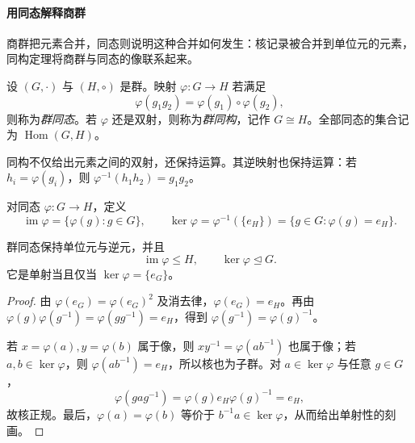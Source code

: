 \documentclass[lang=cn,a4paper,fontset=none,zihao=false,10pt,openany,twoside]{beautybook}
\numberwithin{algorithm}{chapter}
\begin{document}
\paragraph{用同态解释商群}
商群把元素合并，同态则说明这种合并如何发生：核记录被合并到单位元的元素，同构定理将商群与同态的像联系起来。
\begin{definition}[群同态与同构]
设 $(G,\cdot)$ 与 $(H,\circ)$ 是群。映射 $\varphi:G\to H$ 若满足
\[
 \varphi(g_1g_2)=\varphi(g_1)\circ\varphi(g_2),
\]
则称为\emph{群同态}。若 $\varphi$ 还是双射，则称为\emph{群同构}，记作 $G\cong H$。全部同态的集合记为 $\operatorname{Hom}(G,H)$。
\end{definition}
同构不仅给出元素之间的双射，还保持运算。其逆映射也保持运算：若 $h_i=\varphi(g_i)$，则 $\varphi^{-1}(h_1h_2)=g_1g_2$。

\begin{definition}[像与核]
对同态 $\varphi:G\to H$，定义
\[
 \operatorname{im}\varphi=\{\varphi(g):g\in G\},\qquad
 \ker\varphi=\varphi^{-1}(\{e_H\})=\{g\in G:\varphi(g)=e_H\}.
\]
\end{definition}
\begin{proposition}\label{prop:hom-kernel}
群同态保持单位元与逆元，并且
\[
 \operatorname{im}\varphi\le H,\qquad\ker\varphi\trianglelefteq G.
\]
它是单射当且仅当 $\ker\varphi=\{e_G\}$。
\end{proposition}
\begin{proof}
由 $\varphi(e_G)=\varphi(e_G)^2$ 及消去律，$\varphi(e_G)=e_H$。再由 $\varphi(g)\varphi(g^{-1})=\varphi(gg^{-1})=e_H$，得到 $\varphi(g^{-1})=\varphi(g)^{-1}$。

若 $x=\varphi(a),y=\varphi(b)$ 属于像，则 $xy^{-1}=\varphi(ab^{-1})$ 也属于像；若 $a,b\in\ker\varphi$，则 $\varphi(ab^{-1})=e_H$，所以核也为子群。对 $a\in\ker\varphi$ 与任意 $g\in G$，
\[
 \varphi(gag^{-1})=\varphi(g)e_H\varphi(g)^{-1}=e_H,
\]
故核正规。最后，$\varphi(a)=\varphi(b)$ 等价于 $b^{-1}a\in\ker\varphi$，从而给出单射性的刻画。
\end{proof}
\end{document}
